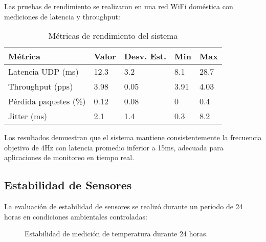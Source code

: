 \documentclass[conference,a4paper]{IEEEtran}
\begin{document}
Las pruebas de rendimiento se realizaron en una red WiFi doméstica con mediciones de latencia y throughput:

\begin{table}[H]
\centering
\caption{Métricas de rendimiento del sistema}
\begin{tabular}{@{}lllll@{}}
\toprule
\textbf{Métrica} & \textbf{Valor} & \textbf{Desv. Est.} & \textbf{Min} & \textbf{Max} \\
\midrule
Latencia UDP (ms) & 12.3 & 3.2 & 8.1 & 28.7 \\
Throughput (pps) & 3.98 & 0.05 & 3.91 & 4.03 \\
Pérdida paquetes (\%) & 0.12 & 0.08 & 0 & 0.4 \\
Jitter (ms) & 2.1 & 1.4 & 0.3 & 8.2 \\
\bottomrule
\end{tabular}
\label{tab:performance}
\end{table}

Los resultados demuestran que el sistema mantiene consistentemente la frecuencia objetivo de 4Hz con latencia promedio inferior a 15ms, adecuada para aplicaciones de monitoreo en tiempo real.

\subsection{Estabilidad de Sensores}

La evaluaci\'on de estabilidad de sensores se realiz\'o durante un per\'iodo de 24 horas en condiciones ambientales controladas:

\begin{figure}[H]
    \centering
    \caption{Estabilidad de medici\'on de temperatura durante 24 horas.}
    \label{fig:temp_stability}
\end{figure}
\end{document}

